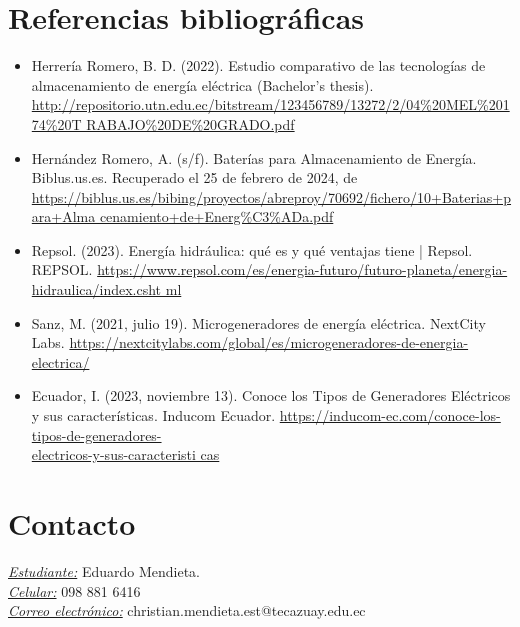 \documentclass[11pt]{article}
\begin{document}
    \section{Referencias bibliográficas}
            \begin{itemize}
                \item Herrería Romero, B. D. (2022). Estudio comparativo de las tecnologías de
                almacenamiento de energía eléctrica (Bachelor's thesis).
                \url{http://repositorio.utn.edu.ec/bitstream/123456789/13272/2/04%
                RABAJO%
                
                \item Hernández Romero, A. (s/f). Baterías para Almacenamiento de Energía.
                Biblus.us.es. Recuperado el 25 de febrero de 2024, de 
                \url{https://biblus.us.es/bibing/proyectos/abreproy/70692/fichero/10+Baterias+para+Alma
                cenamiento+de+Energ%
                
                \item Repsol. (2023). Energía hidráulica: qué es y qué ventajas tiene | Repsol. REPSOL.
                \url{https://www.repsol.com/es/energia-futuro/futuro-planeta/energia-hidraulica/index.csht
                ml}
                
                \item Sanz, M. (2021, julio 19). Microgeneradores de energía eléctrica. NextCity Labs.
                \url{https://nextcitylabs.com/global/es/microgeneradores-de-energia-electrica/
                }

                \item Ecuador, I. (2023, noviembre 13). Conoce los Tipos de Generadores Eléctricos y sus
                características. Inducom Ecuador. 
                \url{https://inducom-ec.com/conoce-los-tipos-de-generadores-} \\ \url{electricos-y-sus-caracteristi
                cas}
            \end{itemize}


   
    \section{Contacto}

        \noindent \textit{\underline{Estudiante:}} Eduardo Mendieta. \\
        \textit{\underline{Celular:}} 098 881 6416 \\
        \textit{\underline{Correo electrónico:}} christian.mendieta.est@tecazuay.edu.ec \\\
\end{document}

